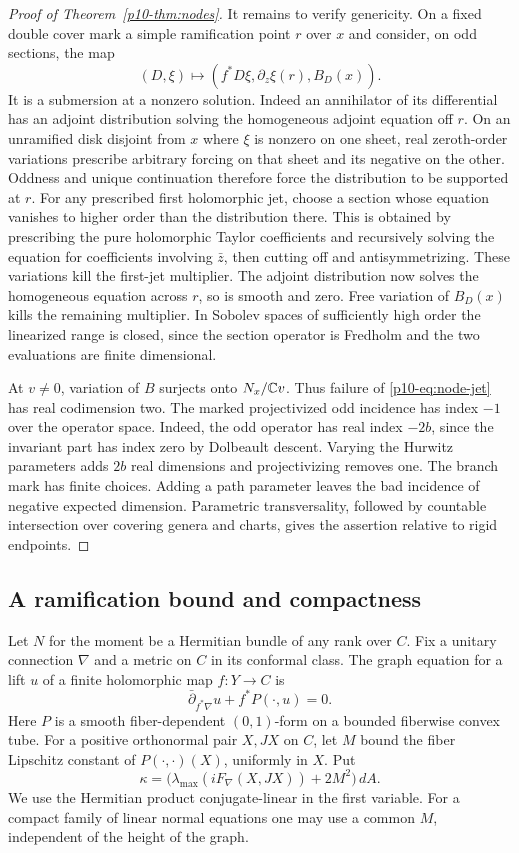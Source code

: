 \begin{proof}[Proof of Theorem~\ref{p10-thm:nodes}]
It remains to verify genericity. On a fixed double cover mark a simple
ramification point $r$ over $x$ and consider, on odd sections, the map
\[
          (D,\xi)\longmapsto(f^*D\xi,\partial_z\xi(r),B_D(x)) .
\]
It is a submersion at a nonzero solution. Indeed an annihilator of its
differential has an adjoint distribution solving the homogeneous adjoint
equation off $r$. On an unramified disk disjoint from $x$ where $\xi$ is
nonzero on one sheet, real zeroth-order variations prescribe arbitrary
forcing on that sheet and its negative on the other. Oddness and unique
continuation therefore force the distribution to be supported at $r$.
For any prescribed first holomorphic jet, choose a section whose equation
vanishes to higher order than the distribution there. This is obtained
by prescribing the pure holomorphic Taylor coefficients and recursively
solving the equation for coefficients involving $\bar z$, then cutting
off and antisymmetrizing. These variations kill the first-jet multiplier.
The adjoint distribution now solves the homogeneous equation across $r$,
so is smooth and zero. Free variation of $B_D(x)$ kills the remaining
multiplier. In Sobolev spaces of sufficiently high order the linearized
range is closed, since the section operator is Fredholm and the two
evaluations are finite dimensional.

At $v\ne0$, variation of $B$ surjects onto $N_x/\mathbb C v$. Thus failure
of \eqref{p10-eq:node-jet} has real codimension two. The marked projectivized
odd incidence has index $-1$ over the operator space. Indeed, the odd
operator has real index $-2b$, since the invariant part has index zero
by Dolbeault descent. Varying the Hurwitz parameters adds $2b$ real
dimensions and projectivizing removes one. The branch mark has finite
choices. Adding a path parameter leaves the bad incidence of negative
expected dimension. Parametric transversality, followed by countable
intersection over covering genera and charts, gives the assertion
relative to rigid endpoints.
\end{proof}
\subsection{A ramification bound and compactness}\label{p10-sec:compactness}
Let $N$ for the moment be a Hermitian bundle of any rank over $C$.
Fix a unitary connection $\nabla$ and a metric on $C$ in its
conformal class. The graph equation for a lift $u$ of a finite
holomorphic map $f:Y\to C$ is
\[
  \bar\partial_{f^*\nabla}u + f^*P(\cdot,u)=0.
\]
Here $P$ is a smooth fiber-dependent $(0,1)$-form on a bounded
fiberwise convex tube. For a positive orthonormal pair $X,JX$ on $C$,
let $M$ bound the fiber Lipschitz constant of $P(\cdot,\cdot)(X)$,
uniformly in $X$. Put
\[
  \kappa=\bigl(\lambda_{\max}(iF_\nabla(X,JX))+2M^2\bigr)\,dA .
\]
We use the Hermitian product conjugate-linear in the first variable.
For a compact family of linear normal equations one may use a common
$M$, independent of the height of the graph.

